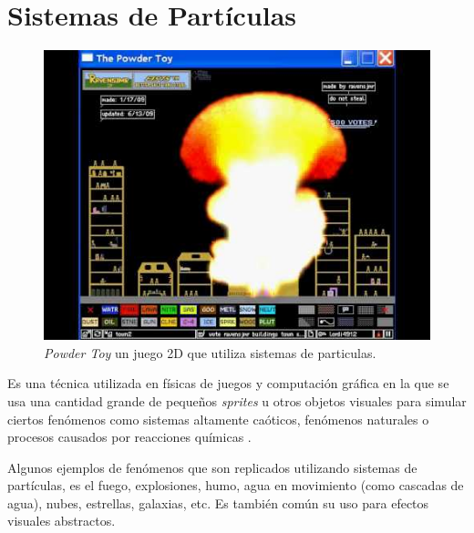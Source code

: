 \section{Sistemas de Partículas}
\setlength\intextsep{0pt}
\begin{figure}
\includegraphics[width=\linewidth]{semana14/powdertoy.jpg}
\caption{\emph{Powder Toy} un juego 2D que utiliza sistemas de particulas.}
\label{fig:particles}
\end{figure}
Es una técnica utilizada en físicas de juegos y computación gráfica en la que se usa una cantidad grande de pequeños \emph{sprites} u otros objetos visuales para simular ciertos fenómenos como sistemas altamente caóticos, fenómenos naturales o procesos causados por reacciones químicas \cite{vanderburg_particlesystem}. 

Algunos ejemplos de fenómenos que son replicados utilizando sistemas de partículas, es el fuego, explosiones, humo, agua en movimiento (como cascadas de agua), nubes, estrellas, galaxias, etc. Es también común su uso para efectos visuales abstractos.
